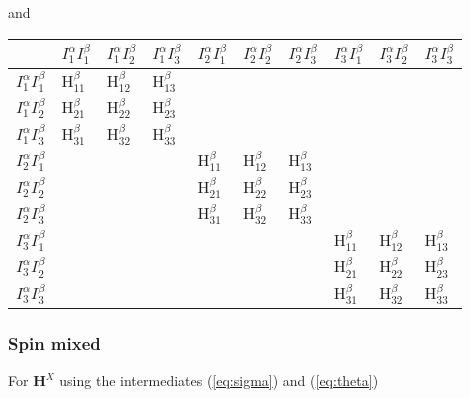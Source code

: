 and

\begin{table}[H]
\begin{center}
\begin{tabular}{|l||l|l|l|l|l|l|l|l|l|}
\hline
 & $I_{1}^{\alpha} I_{1}^{\beta}$ & $I_{1}^{\alpha} I_{2}^{\beta}$  &  $I_{1}^{\alpha} I_{3}^{\beta}$ &  $I_{2}^{\alpha} I_{1}^{\beta}$ & $I_{2}^{\alpha} I_{2}^{\beta}$  &  $I_{2}^{\alpha} I_{3}^{\beta}$ &  $I_{3}^{\alpha} I_{1}^{\beta}$ &  $I_{3}^{\alpha} I_{2}^{\beta}$ & $I_{3}^{\alpha} I_{3}^{\beta}$ \\ \hline \hline
$I_{1}^{\alpha} I_{1}^{\beta}$ & $\text{H}^{\beta}_{11}$ & $\text{H}^{\beta}_{12}$ & $\text{H}^{\beta}_{13}$ &  &  &  &  &  &  \\ \hline
$I_{1}^{\alpha} I_{2}^{\beta}$ & $\text{H}^{\beta}_{21}$ & $\text{H}^{\beta}_{22}$ & $\text{H}^{\beta}_{23}$ &  &  &  &  &  &  \\ \hline
$I_{1}^{\alpha} I_{3}^{\beta}$ & $\text{H}^{\beta}_{31}$ & $\text{H}^{\beta}_{32}$ & $\text{H}^{\beta}_{33}$ &  &  &  &  &  &  \\ \hline
$I_{2}^{\alpha} I_{1}^{\beta}$ &  &  &  &  $\text{H}^{\beta}_{11}$ & $\text{H}^{\beta}_{12}$ & $\text{H}^{\beta}_{13}$  &  &  &  \\ \hline
$I_{2}^{\alpha} I_{2}^{\beta}$ &  &  &  &  $\text{H}^{\beta}_{21}$ & $\text{H}^{\beta}_{22}$ & $\text{H}^{\beta}_{23}$  &  &  &  \\ \hline
$I_{2}^{\alpha} I_{3}^{\beta}$ &  &  &  &  $\text{H}^{\beta}_{31}$ & $\text{H}^{\beta}_{32}$ & $\text{H}^{\beta}_{33}$  &  &  &  \\ \hline
$I_{3}^{\alpha} I_{1}^{\beta}$ &  &  &  &  &  &  &  $\text{H}^{\beta}_{11}$ & $\text{H}^{\beta}_{12}$ & $\text{H}^{\beta}_{13}$ \\ \hline
$I_{3}^{\alpha} I_{2}^{\beta}$ &  &  &  &  &  &  &  $\text{H}^{\beta}_{21}$ & $\text{H}^{\beta}_{22}$ & $\text{H}^{\beta}_{23}$  \\ \hline
$I_{3}^{\alpha} I_{3}^{\beta}$ &  &  &  &  &  &  &  $\text{H}^{\beta}_{31}$ & $\text{H}^{\beta}_{32}$ & $\text{H}^{\beta}_{33}$  \\ \hline
\end{tabular}
\end{center}
\end{table}
\subsubsection{Spin mixed}
For $\textbf{H}^X$ using the intermediates (\ref{eq:sigma}) and (\ref{eq:theta})

